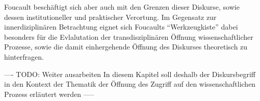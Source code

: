 Foucault beschäftigt sich aber auch mit den Grenzen dieser Diskurse, sowie dessen institutioneller und praktischer Verortung. Im Gegensatz zur innerdiziplinären Betrachtung eignet sich Foucaults “Werkzeugkiste”\cite{Honneth_2003} dabei besonders für die Evlalutation der transdisziplinären Öffnung wissenschaftlicher Prozesse, sowie die damit einhergehende Öffnung des Diskurses theoretisch zu hinterfragen.

---- TODO: Weiter ausarbeiten In diesem Kapitel soll deshalb der Diskursbegriff in den Kontext der Thematik der Öffnung des Zugriff auf den wissenschaftlichen Prozess erläutert werden -----
